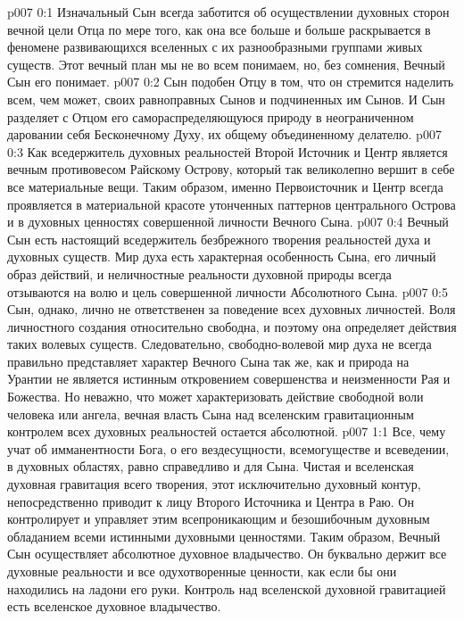 \author{Божественный Советник}
\vs p007 0:1 Изначальный Сын всегда заботится об осуществлении духовных сторон вечной цели Отца по мере того, как она все больше и больше раскрывается в феномене развивающихся вселенных с их разнообразными группами живых существ. Этот вечный план мы не во всем понимаем, но, без сомнения, Вечный Сын его понимает.
\vs p007 0:2 Сын подобен Отцу в том, что он стремится наделить всем, чем может, своих равноправных Сынов и подчиненных им Сынов. И Сын разделяет с Отцом его самораспределяющуюся природу в неограниченном даровании себя Бесконечному Духу, их общему объединенному делателю.
\vs p007 0:3 \pc Как вседержитель духовных реальностей Второй Источник и Центр является вечным противовесом Райскому Острову, который так великолепно вершит в себе все материальные вещи. Таким образом, именно Первоисточник и Центр всегда проявляется в материальной красоте утонченных паттернов центрального Острова и в духовных ценностях совершенной личности Вечного Сына.
\vs p007 0:4 \pc Вечный Сын есть настоящий вседержитель безбрежного творения реальностей духа и духовных существ. Мир духа есть характерная особенность Сына, его личный образ действий, и неличностные реальности духовной природы всегда отзываются на волю и цель совершенной личности Абсолютного Сына.
\vs p007 0:5 Сын, однако, лично не ответственен за поведение всех духовных личностей. Воля личностного создания относительно свободна, и поэтому она определяет действия таких волевых существ. Следовательно, свободно\hyp{}волевой мир духа не всегда правильно представляет характер Вечного Сына так же, как и природа на Урантии не является истинным откровением совершенства и неизменности Рая и Божества. Но неважно, что может характеризовать действие свободной воли человека или ангела, вечная власть Сына над вселенским гравитационным контролем всех духовных реальностей остается абсолютной.
\vs p007 1:1 Все, чему учат об имманентности Бога, о его вездесущности, всемогуществе и всеведении, в духовных областях, равно справедливо и для Сына. Чистая и вселенская духовная гравитация всего творения, этот исключительно духовный контур, непосредственно приводит к лицу Второго Источника и Центра в Раю. Он контролирует и управляет этим всепроникающим и безошибочным духовным обладанием всеми истинными духовными ценностями. Таким образом, Вечный Сын осуществляет абсолютное духовное владычество. Он буквально держит все духовные реальности и все одухотворенные ценности, как если бы они находились на ладони его руки. Контроль над вселенской духовной гравитацией есть вселенское духовное владычество.
